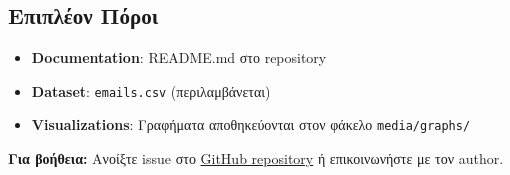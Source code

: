\documentclass[12pt,a4paper,twoside]{book}
\begin{document}
\subsection{Επιπλέον Πόροι}

\begin{itemize}
    \item \textbf{Documentation}: README.md στο repository
    \item \textbf{Dataset}: \texttt{emails.csv} (περιλαμβάνεται)
    \item \textbf{Visualizations}: Γραφήματα αποθηκεύονται στον φάκελο \texttt{media/graphs/}
\end{itemize}

\textbf{Για βοήθεια:} Ανοίξτε issue στο \href{https://github.com/vasilisbit/spam-recognision}{GitHub repository} ή επικοινωνήστε με τον author.
\end{document}
